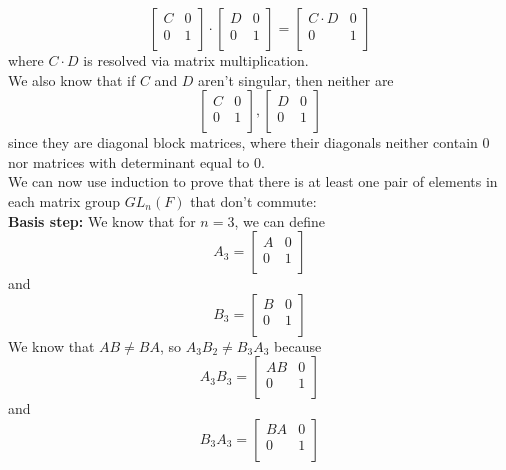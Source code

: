 \documentclass[12pt]{article}
\begin{document}
    \[ \begin{bmatrix}
        C & 0 \\
        0 & 1 \\
    \end{bmatrix} \cdot
    \begin{bmatrix}
        D & 0 \\
        0 & 1 \\
    \end{bmatrix}
    = \begin{bmatrix}
        C \cdot D & 0 \\
        0 & 1 \\
    \end{bmatrix} \]
    where $C \cdot D$ is resolved via matrix multiplication. \\
    We also know that if $C$ and $D$ aren't singular,
    then neither are
    \[ \begin{bmatrix}
        C & 0 \\
        0 & 1 \\
    \end{bmatrix}, 
    \begin{bmatrix}
        D & 0 \\
        0 & 1 \\
    \end{bmatrix} \]
    since they are diagonal block matrices, where their diagonals neither
    contain 0 nor matrices with determinant equal to 0. \\
    We can now use induction to prove that there is at least one pair of
    elements in each matrix group $GL_n(F)$ that don't commute: \\
    \textbf{Basis step:}
    We know that for $n = 3$, we can define
    \[ A_3 =
    \begin{bmatrix}
    A & 0 \\
    0 & 1 \\
    \end{bmatrix}\]
    and 
    \[ B_3 =
    \begin{bmatrix}
    B & 0 \\
    0 & 1 \\
    \end{bmatrix} \]
    We know that $AB \neq BA$,
    so $A_3B_2 \neq B_3A_3$ because
    \[ A_3B_3 = 
    \begin{bmatrix}
    AB & 0 \\
    0 & 1 \\
    \end{bmatrix}\]
    and 
    \[ B_3A_3 =
    \begin{bmatrix}
    BA & 0 \\
    0 & 1 \\
    \end{bmatrix} \]
\end{document}
